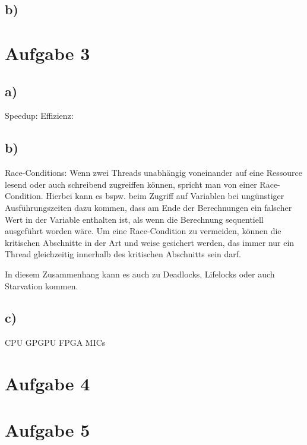 \documentclass{article}
\begin{document}
	\subsection{b)}

    \section{Aufgabe 3}
        \subsection{a)}
        Speedup:
        Effizienz:
        \subsection{b)}
        Race-Conditions: Wenn zwei Threads unabhängig voneinander auf eine Ressource lesend oder auch schreibend zugreiffen können, 
        spricht man von einer Race-Condition. Hierbei kann es bspw. beim Zugriff auf Variablen bei ungünstiger Ausführungszeiten
        dazu kommen, dass am Ende der Berechnungen ein falscher Wert in der Variable enthalten ist, als wenn die Berechnung sequentiell 
        ausgeführt worden wäre.
        Um eine Race-Condition zu vermeiden, können die kritischen Abschnitte in der Art und weise gesichert werden, das immer nur ein 
        Thread gleichzeitig innerhalb des kritischen Abschnitts sein darf.

        In diesem Zusammenhang kann es auch zu Deadlocks, Lifelocks oder auch Starvation kommen. 
        \subsection{c)}
        CPU
        GPGPU
        FPGA
        MICs

    \section{Aufgabe 4}

    \section{Aufgabe 5}
\end{document}
